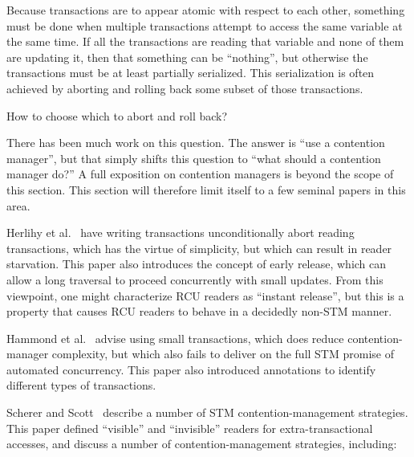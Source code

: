 Because transactions are to appear atomic with respect to each other,
something must be done when multiple transactions attempt to access the
same variable at the same time.
If all the transactions are reading that variable and none of them are
updating it, then that something can be ``nothing'', but otherwise
the transactions must be at least partially serialized.
This serialization is often achieved by aborting and rolling back some
subset of those transactions.

How to choose which to abort and roll back?

There has been much work on this question.
The answer is ``use a contention manager'', but that simply shifts this
question to ``what should a contention manager do?''
A full exposition on contention managers is beyond the scope of this section.
This section will therefore limit itself to a few seminal papers
in this area.

Herlihy et al.~\cite{HerlihyLMS03}
have writing transactions unconditionally abort reading transactions,
which has the virtue of simplicity, but which can result in reader
starvation.
This paper also introduces the concept of early release, which can
allow a long traversal to proceed concurrently with small updates.
From this viewpoint, one might characterize RCU readers as ``instant
release'', but this is a property that causes RCU readers to behave in
a decidedly non-STM manner.

Hammond et al.~\cite{LanceHammond2004a}
advise using small transactions, which does reduce contention-manager
complexity, but which also fails to deliver on the full STM promise
of automated concurrency.
This paper also introduced annotations to identify different types of
transactions.

Scherer and Scott~\cite{WilliamNSchererIII2005}
describe a number of STM contention-management strategies.
This paper defined ``visible'' and ``invisible'' readers for
extra-transactional accesses, and discuss a number of contention-management
strategies, including:

